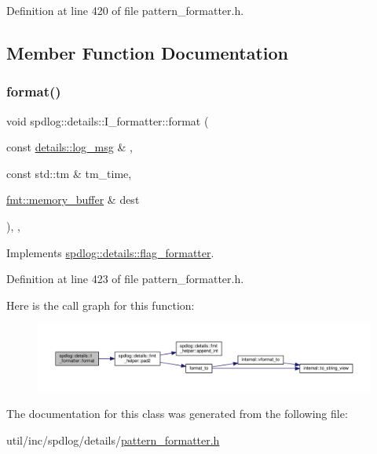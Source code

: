 Definition at line 420 of file pattern\+\_\+formatter.\+h.



\subsection{Member Function Documentation}
\mbox{\label{classspdlog_1_1details_1_1_i__formatter_ab9d6511acc53b2296ecce30f715779c7}} 
\subsubsection{\texorpdfstring{format()}{format()}}
{\footnotesize\ttfamily void spdlog\+::details\+::\+I\+\_\+formatter\+::format (\begin{DoxyParamCaption}\item[{const \hyperlink{structspdlog_1_1details_1_1log__msg}{details\+::log\+\_\+msg} \&}]{,  }\item[{const std\+::tm \&}]{tm\+\_\+time,  }\item[{\hyperlink{format_8h_a21cbf729f69302f578e6db21c5e9e0d2}{fmt\+::memory\+\_\+buffer} \&}]{dest }\end{DoxyParamCaption})\hspace{0.3cm}{\ttfamily [inline]}, {\ttfamily [override]}, {\ttfamily [virtual]}}



Implements \hyperlink{classspdlog_1_1details_1_1flag__formatter_a33fb3e42a4c8200cceb833d92b53fb67}{spdlog\+::details\+::flag\+\_\+formatter}.



Definition at line 423 of file pattern\+\_\+formatter.\+h.

Here is the call graph for this function\+:
\nopagebreak
\begin{figure}[H]
\begin{center}
\leavevmode
\includegraphics[width=350pt]{classspdlog_1_1details_1_1_i__formatter_ab9d6511acc53b2296ecce30f715779c7_cgraph}
\end{center}
\end{figure}


The documentation for this class was generated from the following file\+:\begin{DoxyCompactItemize}
\item 
util/inc/spdlog/details/\hyperlink{pattern__formatter_8h}{pattern\+\_\+formatter.\+h}\end{DoxyCompactItemize}
